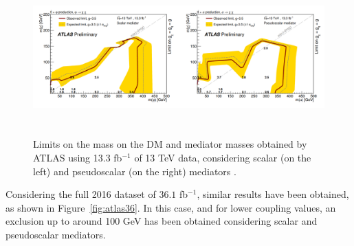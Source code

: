 \documentclass[a4paper, 10pt, openright]{report}
\begin{document}
\begin{figure}[htbp]
\begin{center}
\includegraphics[width=14cm, height=6cm]{figs/Atlasttbar13fb.png}
\caption{Limits on the mass on the \ac{DM} and mediator masses obtained by \ac{ATLAS} using 13.3 fb$^{-1}$ of 13 TeV data, considering scalar (on the left) and pseudoscalar (on the right) mediators \cite{PreviousDoubleTopNoLep13ATLAS}.}
\label{fig:ATLAS13}
\end{center}
\end{figure}

Considering the full 2016 dataset of $36.1$ fb$^{-1}$, similar results have been obtained, as shown in Figure~\ref{fig:atlas36}. In this case, and for lower coupling values, an exclusion up to around 100 GeV has been obtained considering scalar and pseudoscalar mediators.
\end{document}
